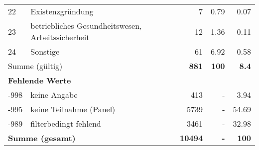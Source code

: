 \begin{longtable}{lXrrr}
        22 & \multicolumn{1}{X}{Existenzgründung} & %
          \num{7} &
          \num[round-mode=places,round-precision=2]{0.79} &
          \num[round-mode=places,round-precision=2]{0.07} \\

        23 & \multicolumn{1}{X}{betriebliches Gesundheitswesen, Arbeitssicherheit} & %
          \num{12} &
          \num[round-mode=places,round-precision=2]{1.36} &
          \num[round-mode=places,round-precision=2]{0.11} \\

        24 & \multicolumn{1}{X}{Sonstige} & %
          \num{61} &
          \num[round-mode=places,round-precision=2]{6.92} &
          \num[round-mode=places,round-precision=2]{0.58} \\

     \midrule
     \multicolumn{2}{l}{Summe (gültig)} &
       \textbf{\num{881}} &
     \textbf{\num{100}} &
       \textbf{\num[round-mode=places,round-precision=2]{8.4}} \\
     \multicolumn{5}{l}{\textbf{Fehlende Werte}}\\
       -998 &
       keine Angabe &
         \num{413} &
        - &
         \num[round-mode=places,round-precision=2]{3.94} \\
       -995 &
       keine Teilnahme (Panel) &
         \num{5739} &
        - &
         \num[round-mode=places,round-precision=2]{54.69} \\
       -989 &
       filterbedingt fehlend &
         \num{3461} &
        - &
         \num[round-mode=places,round-precision=2]{32.98} \\
     \midrule
     \multicolumn{2}{l}{\textbf{Summe (gesamt)}} &
          \textbf{\num{10494}} &
        \textbf{-} &
        \textbf{\num{100}} \\
     \bottomrule
     \end{longtable}
     
